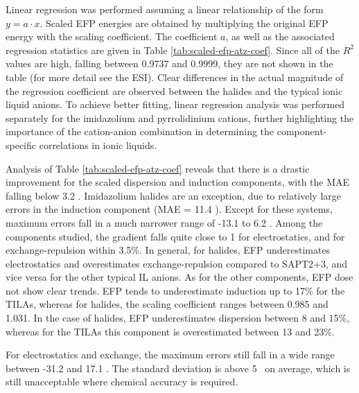 Linear regression was performed assuming a linear relationship of the form $ y = a \cdot x $.
Scaled EFP energies are obtained by multiplying the original EFP energy with the scaling coefficient.
The coefficient $a$, as well as the associated regression statistics are given in Table \ref{tab:scaled-efp-atz-coef}.
Since all of the $R^2$ values are high, falling between 0.9737 and 0.9999, they are not shown in the table (for more detail see the ESI).
Clear differences in the actual magnitude of the regression coefficient are observed between the halides and the typical ionic liquid anions.
To achieve better fitting, linear regression analysis was performed separately for the imidazolium and pyrrolidinium cations, further highlighting the importance of the cation-anion combination in determining the component-specific correlations in ionic liquids.


Analysis of Table \ref{tab:scaled-efp-atz-coef} reveals that there is a drastic improvement for the scaled dispersion and induction components, with the MAE falling below 3.2 \enUnit. 
Imidazolium halides are an exception, due to relatively large errors in the induction component (MAE = 11.4 \enUnit).
Except for these systems, maximum errors fall in a much narrower range of -13.1 to 6.2 \enUnit.
Among the components studied, the gradient falls quite close to 1 for electrostatics, and for exchange-repulsion within 3.5\%.
In general, for halides, EFP underestimates electrostatics and overestimates exchange-repulsion compared to SAPT2+3, and vice versa for the other typical IL anions.
As for the other components, EFP dose not show clear trends.
EFP tends to  underestimate induction up to 17\% for the TILAs, whereas for halides, the scaling coefficient ranges between 0.985 and 1.031.
In the case of halides, EFP underestimates dispersion between 8 and 15\%, whereas for the TILAs this component is overestimated between 13 and 23\%. 


For electrostatics and exchange, the maximum errors still fall in a wide range between -31.2 and 17.1 \enUnit.
The standard deviation is above 5 \enUnit~on average, which is still unacceptable where chemical accuracy is required.


